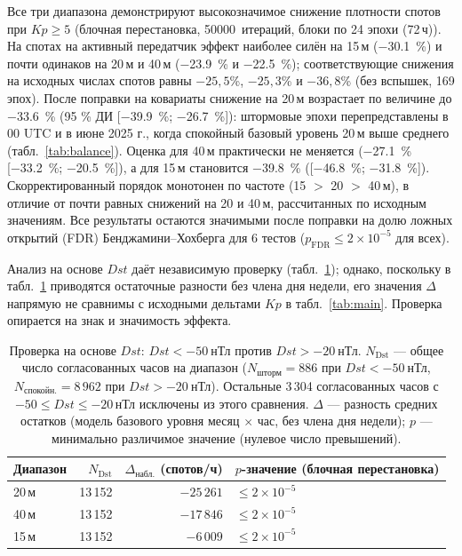 \documentclass{agujournal2019}
\begin{document}
Все три диапазона демонстрируют высокозначимое снижение плотности спотов
при $Kp \ge 5$ (блочная перестановка, \SI{50000}{\mbox{итераций}},
блоки по 24 эпохи (72\,ч)). На спотах на активный передатчик эффект
наиболее силён на 15\,м (\SI{-30,1}{\percent}) и почти
одинаков на 20\,м и 40\,м (\SI{-23,9}{\percent} и
\SI{-22,5}{\percent}); соответствующие снижения на исходных
числах спотов равны $-25{,}5$\%, $-25{,}3$\% и $-36{,}8$\% (без вспышек, 169 эпох). После поправки на
ковариаты снижение на 20\,м возрастает по величине до \SI{-33.6}{\percent}
(95 \% ДИ [\SI{-39.9}{\percent}; \SI{-26.7}{\percent}]): штормовые эпохи
перепредставлены в 00 UTC и в июне 2025 г., когда спокойный базовый
уровень 20\,м выше среднего (табл.~\ref{tab:balance}). Оценка для 40\,м
практически не меняется (\SI{-27.1}{\percent}
[\SI{-33.2}{\percent}; \SI{-20.5}{\percent}]), а для 15\,м становится
\SI{-39.8}{\percent} ([\SI{-46.8}{\percent}; \SI{-31.8}{\percent}]).
Скорректированный порядок монотонен по частоте (15 $>$ 20 $>$ 40\,м),
в отличие от почти равных снижений на 20 и 40\,м, рассчитанных по исходным
значениям. Все результаты
остаются значимыми после поправки на долю ложных открытий (FDR)
Бенджамини--Хохберга для 6 тестов
($p_{\text{FDR}} \le 2 \times 10^{-5}$ для всех).

Анализ на основе $Dst$ даёт независимую проверку
(табл.~\ref{tab:dst}); однако, поскольку в табл.~\ref{tab:dst} приводятся
остаточные разности без члена дня недели, его значения $\Delta$ напрямую
не сравнимы с исходными дельтами $Kp$ в табл.~\ref{tab:main}. Проверка
опирается на знак и значимость эффекта.

\begin{table}[h]
	\centering
	\caption{Проверка на основе $Dst$: $Dst < \SI{-50}{\mbox{нТл}}$ против
		$Dst > \SI{-20}{\mbox{нТл}}$. $N_{\text{Dst}}$ — общее число согласованных
		часов на диапазон ($N_{\mbox{шторм}} = 886$ при
		$Dst < \SI{-50}{\mbox{нТл}}$, $N_{\mbox{спокойн.}} = 8\,962$ при
		$Dst > \SI{-20}{\mbox{нТл}}$). Остальные 3\,304 согласованных часов с
		$-50 \le Dst \le -20$\,нТл исключены из этого сравнения.
		$\Delta$ — разность средних остатков (модель базового уровня
		месяц $\times$ час, без члена дня недели); $p$ — минимально различимое значение (нулевое число превышений).}
	\label{tab:dst}
	\begin{tabular}{lrrl}
		\toprule
		Диапазон  & $N_{\text{Dst}}$  & $\Delta_{\mbox{набл.}}$ (спотов/ч)
		      & $p$-значение (блочная перестановка)                                                    \\
		\midrule
		20\,м & 13\,152           & $-25\,261$                           & $\le 2 \times 10^{-5}$ \\
		40\,м & 13\,152           & $-17\,846$                           & $\le 2 \times 10^{-5}$ \\
		15\,м & 13\,152           & $-6\,009$                            & $\le 2 \times 10^{-5}$ \\
		\bottomrule
	\end{tabular}
\end{table}
\end{document}
